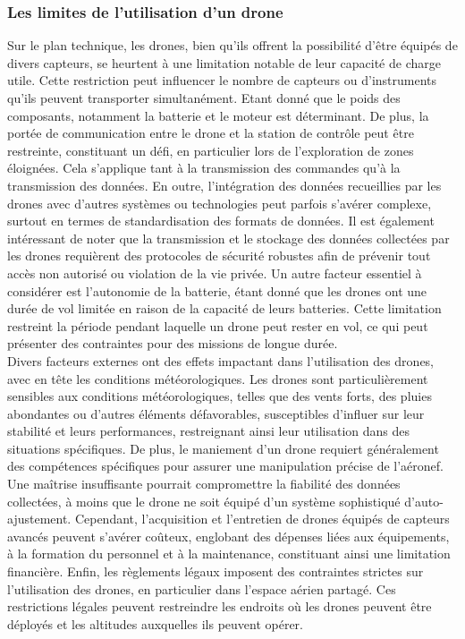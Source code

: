 \subsubsection{Les limites de l’utilisation d’un drone}
Sur le plan technique, les drones, bien qu'ils offrent la possibilité d'être équipés de divers capteurs, se heurtent à une limitation notable de leur capacité de charge utile. Cette restriction peut influencer le nombre de capteurs ou d'instruments qu'ils peuvent transporter simultanément. Etant donné que le poids des composants, notamment la batterie et le moteur est déterminant. De plus, la portée de communication entre le drone et la station de contrôle peut être restreinte, constituant un défi, en particulier lors de l'exploration de zones éloignées. Cela s'applique tant à la transmission des commandes qu'à la transmission des données. En outre, l'intégration des données recueillies par les drones avec d'autres systèmes ou technologies peut parfois s'avérer complexe, surtout en termes de standardisation des formats de données. Il est également intéressant de noter que la transmission et le stockage des données collectées par les drones requièrent des protocoles de sécurité robustes afin de prévenir tout accès non autorisé ou violation de la vie privée. Un autre facteur essentiel à considérer est l'autonomie de la batterie, étant donné que les drones ont une durée de vol limitée en raison de la capacité de leurs batteries. Cette limitation restreint la période pendant laquelle un drone peut rester en vol, ce qui peut présenter des contraintes pour des missions de longue durée.
\\

Divers facteurs externes ont des effets impactant dans l'utilisation des drones, avec en tête les conditions météorologiques. Les drones sont particulièrement sensibles aux conditions météorologiques, telles que des vents forts, des pluies abondantes ou d'autres éléments défavorables, susceptibles d'influer sur leur stabilité et leurs performances, restreignant ainsi leur utilisation dans des situations spécifiques. De plus, le maniement d'un drone requiert généralement des compétences spécifiques pour assurer une manipulation précise de l'aéronef. Une maîtrise insuffisante pourrait compromettre la fiabilité des données collectées, à moins que le drone ne soit équipé d'un système sophistiqué d'auto-ajustement. Cependant, l'acquisition et l'entretien de drones équipés de capteurs avancés peuvent s'avérer coûteux, englobant des dépenses liées aux équipements, à la formation du personnel et à la maintenance, constituant ainsi une limitation financière. Enfin, les règlements légaux imposent des contraintes strictes sur l'utilisation des drones, en particulier dans l'espace aérien partagé. Ces restrictions légales peuvent restreindre les endroits où les drones peuvent être déployés et les altitudes auxquelles ils peuvent opérer.

